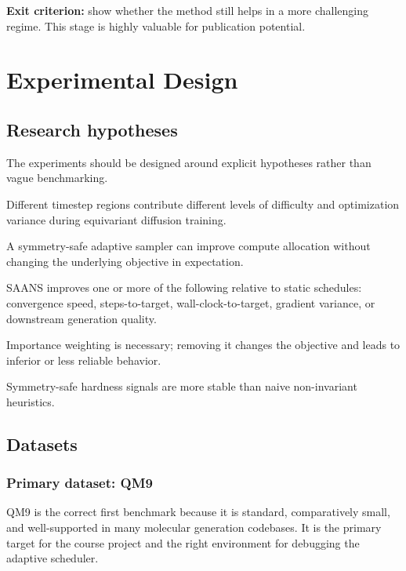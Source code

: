\documentclass[11pt]{report}
\begin{document}
\textbf{Exit criterion:} show whether the method still helps in a more challenging regime. This stage is highly valuable for publication potential.

\chapter{Experimental Design}

\section{Research hypotheses}

The experiments should be designed around explicit hypotheses rather than vague benchmarking.

\begin{description}[leftmargin=2em, style=nextline]
    \item[H1:] Different timestep regions contribute different levels of difficulty and optimization variance during equivariant diffusion training.
    \item[H2:] A symmetry-safe adaptive sampler can improve compute allocation without changing the underlying objective in expectation.
    \item[H3:] SAANS improves one or more of the following relative to static schedules: convergence speed, steps-to-target, wall-clock-to-target, gradient variance, or downstream generation quality.
    \item[H4:] Importance weighting is necessary; removing it changes the objective and leads to inferior or less reliable behavior.
    \item[H5:] Symmetry-safe hardness signals are more stable than naive non-invariant heuristics.
\end{description}

\section{Datasets}

\subsection{Primary dataset: QM9}

QM9 is the correct first benchmark because it is standard, comparatively small, and well-supported in many molecular generation codebases. It is the primary target for the course project and the right environment for debugging the adaptive scheduler.
\end{document}
